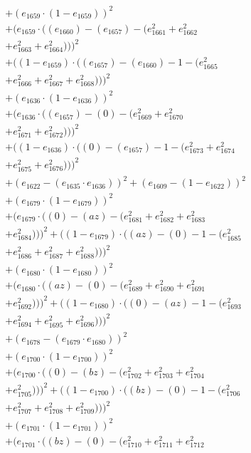 \documentclass[10pt, a4paper]{article}
\begin{document}
\begin{align*}
& + (e_{1659}  \cdot  (1 - e_{1659}))^{2} \\
& + (e_{1659}  \cdot  ((e_{1660}) - (e_{1657}) - (e_{1661}^{2} + e_{1662}^{2} \\
& + e_{1663}^{2} + e_{1664}^{2})))^{2} \\
& + ((1 - e_{1659})  \cdot  ((e_{1657}) - (e_{1660}) - 1 - (e_{1665}^{2} \\
& + e_{1666}^{2} + e_{1667}^{2} + e_{1668}^{2})))^{2} \\
& + (e_{1636}  \cdot  (1 - e_{1636}))^{2} \\
& + (e_{1636}  \cdot  ((e_{1657}) - (0) - (e_{1669}^{2} + e_{1670}^{2} \\
& + e_{1671}^{2} + e_{1672}^{2})))^{2} \\
& + ((1 - e_{1636})  \cdot  ((0) - (e_{1657}) - 1 - (e_{1673}^{2} + e_{1674}^{2} \\
& + e_{1675}^{2} + e_{1676}^{2})))^{2} \\
& + (e_{1622} - (e_{1635}  \cdot  e_{1636}))^{2} + (e_{1609} - (1 - e_{1622}))^{2} \\
& + (e_{1679}  \cdot  (1 - e_{1679}))^{2} \\
& + (e_{1679}  \cdot  ((0) - (az) - (e_{1681}^{2} + e_{1682}^{2} + e_{1683}^{2} \\
& + e_{1684}^{2})))^{2} + ((1 - e_{1679})  \cdot  ((az) - (0) - 1 - (e_{1685}^{2} \\
& + e_{1686}^{2} + e_{1687}^{2} + e_{1688}^{2})))^{2} \\
& + (e_{1680}  \cdot  (1 - e_{1680}))^{2} \\
& + (e_{1680}  \cdot  ((az) - (0) - (e_{1689}^{2} + e_{1690}^{2} + e_{1691}^{2} \\
& + e_{1692}^{2})))^{2} + ((1 - e_{1680})  \cdot  ((0) - (az) - 1 - (e_{1693}^{2} \\
& + e_{1694}^{2} + e_{1695}^{2} + e_{1696}^{2})))^{2} \\
& + (e_{1678} - (e_{1679}  \cdot  e_{1680}))^{2} \\
& + (e_{1700}  \cdot  (1 - e_{1700}))^{2} \\
& + (e_{1700}  \cdot  ((0) - (bz) - (e_{1702}^{2} + e_{1703}^{2} + e_{1704}^{2} \\
& + e_{1705}^{2})))^{2} + ((1 - e_{1700})  \cdot  ((bz) - (0) - 1 - (e_{1706}^{2} \\
& + e_{1707}^{2} + e_{1708}^{2} + e_{1709}^{2})))^{2} \\
& + (e_{1701}  \cdot  (1 - e_{1701}))^{2} \\
& + (e_{1701}  \cdot  ((bz) - (0) - (e_{1710}^{2} + e_{1711}^{2} + e_{1712}^{2} \\

\end{align*}
\end{document}
